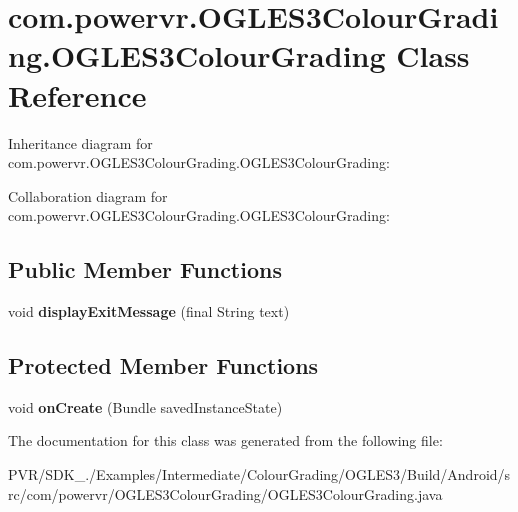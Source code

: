 \hypertarget{classcom_1_1powervr_1_1_o_g_l_e_s3_colour_grading_1_1_o_g_l_e_s3_colour_grading}{\section{com.\+powervr.\+O\+G\+L\+E\+S3\+Colour\+Grading.\+O\+G\+L\+E\+S3\+Colour\+Grading Class Reference}
\label{classcom_1_1powervr_1_1_o_g_l_e_s3_colour_grading_1_1_o_g_l_e_s3_colour_grading}
}


Inheritance diagram for com.\+powervr.\+O\+G\+L\+E\+S3\+Colour\+Grading.\+O\+G\+L\+E\+S3\+Colour\+Grading\+:


Collaboration diagram for com.\+powervr.\+O\+G\+L\+E\+S3\+Colour\+Grading.\+O\+G\+L\+E\+S3\+Colour\+Grading\+:
\subsection*{Public Member Functions}
\begin{DoxyCompactItemize}
\item 
\hypertarget{classcom_1_1powervr_1_1_o_g_l_e_s3_colour_grading_1_1_o_g_l_e_s3_colour_grading_ac0d021d6ebecfdca5449b2bd2f2eed88}{void {\bfseries display\+Exit\+Message} (final String text)}\label{classcom_1_1powervr_1_1_o_g_l_e_s3_colour_grading_1_1_o_g_l_e_s3_colour_grading_ac0d021d6ebecfdca5449b2bd2f2eed88}

\end{DoxyCompactItemize}
\subsection*{Protected Member Functions}
\begin{DoxyCompactItemize}
\item 
\hypertarget{classcom_1_1powervr_1_1_o_g_l_e_s3_colour_grading_1_1_o_g_l_e_s3_colour_grading_aae60b3c5796f177b660def8046fcdb39}{void {\bfseries on\+Create} (Bundle saved\+Instance\+State)}\label{classcom_1_1powervr_1_1_o_g_l_e_s3_colour_grading_1_1_o_g_l_e_s3_colour_grading_aae60b3c5796f177b660def8046fcdb39}

\end{DoxyCompactItemize}


The documentation for this class was generated from the following file\+:\begin{DoxyCompactItemize}
\item 
P\+V\+R/\+S\+D\+K\+\_./\+Examples/\+Intermediate/\+Colour\+Grading/\+O\+G\+L\+E\+S3/\+Build/\+Android/src/com/powervr/\+O\+G\+L\+E\+S3\+Colour\+Grading/O\+G\+L\+E\+S3\+Colour\+Grading.\+java\end{DoxyCompactItemize}

